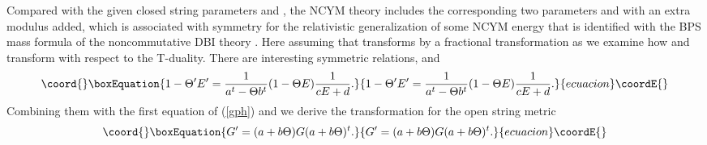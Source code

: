 \documentclass[12pt,a4paper]{article}
\providecommand{\te}{\theta}
\providecommand{\Te}{\Theta}
\begin{document}
Compared with the given closed string parameters \coordHE{} and \coordHE{}, the NCYM
theory includes the corresponding two parameters \coordHE{} and \myHighlight{$\te$}\coordHE{} with an 
extra modulus \myHighlight{$\Phi$}\coordHE{} added, which is associated with \coordHE{} symmetry for
the relativistic generalization of some NCYM energy that is identified 
with the BPS mass formula of the noncommutative DBI theory \cite{PS}.
Here assuming that \myHighlight{$\Te$}\coordHE{} transforms by a fractional transformation as
\myHighlight{$\Te \rightarrow \Te' = (c + d\Te)(a + b\Te)^{-1}$}\coordHE{} we  examine
how \coordHE{} and \myHighlight{$\Phi$}\coordHE{} transform with respect to the T-duality. There are 
interesting symmetric relations, \coordHE{} and 
\begin{equation}\coord{}\boxEquation{
1- \Te 'E' = \frac{1}{a^t - \Te b^t}(1-\Te E)\frac{1}{cE + d}.
\label{the}}{
1- \Te 'E' = \frac{1}{a^t - \Te b^t}(1-\Te E)\frac{1}{cE + d}.
}{ecuacion}\coordE{}\end{equation}
Combining them with the first equation of (\ref{gph}) and \myHighlight{${\Te'}^t =
-\Te'$}\coordHE{} we derive the transformation for the open string metric
\begin{equation}\coord{}\boxEquation{
G' = ( a + b\Te ) G ( a + b \Te )^t.
\label{tg}}{
G' = ( a + b\Te ) G ( a + b \Te )^t.
}{ecuacion}\coordE{}\end{equation}
\end{document}

